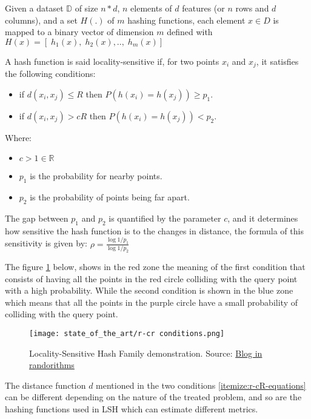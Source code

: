 \label{sect:lsh_formulation}
Given a dataset $\mathbb{D}$ of size $n * d$, $n$ elements of $d$
features (or $n$ rows and $d$ columns), and a set $H(.)$ of $m$ hashing
functions, each element $x \in D$ is mapped to a binary vector of dimension
$m$ defined with $H(x)= [\; h_1(x),\;h_2(x), .., \;h_m(x)] $
\citep{chi_zhu_2017}

A hash function is said locality-sensitive if, for two points $x_i$ and $x_j$, it
satisfies the following conditions:
\begin{itemize}
    \item if $d(x_i, x_j) \leq R$ then $P(h(x_i )= h(x_j )) \geq p_1$.
    \item if $d(x_i,x_j) > cR$ then $P(h(x_i) = h(x_j)) <p_2$.
\end{itemize}
Where:
\begin{multicols}{2}
    \begin{itemize}
        \label{itemize:r-cR-equations}
        \item $c > 1 \in \mathbb{R}$
        \item $p_1$ is the probability for nearby points.
        \item $p_2$ is the probability of points being far apart.
    \end{itemize}
\end{multicols}

The gap between $p_1$ and $p_2$ is quantified by the parameter $c$, and it
determines how sensitive the hash function is to the changes in distance, the
formula of this sensitivity is given by: $\rho = \frac{\log{1/ p_1}}{\log{1/
            p_2}}$

The figure \ref{fig:r_cr_condition} below, shows in the red zone the meaning of
the first condition that consists of having all the points in the red circle
colliding with the query point with a high probability. While the second
condition is shown in the blue zone which means that all the points in the
purple circle have a small probability of colliding with the query point.

\begin{figure}[h]
    \centering
    \texttt{[image: state\_of\_the\_art/r-cr conditions.png]}
    \caption{Locality-Sensitive Hash Family demonstration. Source:
        \href{https://randorithms.com/2019/09/19/Visual-LSH.html}{Blog in
            randorithms}}
    \label{fig:r_cr_condition}
\end{figure}

The distance function $d$ mentioned in the two conditions
\ref{itemize:r-cR-equations} can be different depending on the nature of the
treated problem, and so are the hashing functions used in LSH which can estimate
different metrics.